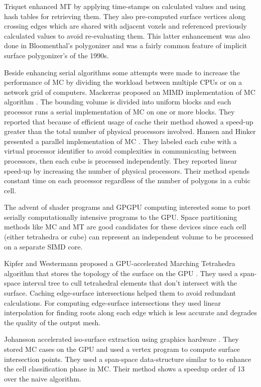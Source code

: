 Triquet \etal \cite{Triquet2003} enhanced MT by applying time-stamps on calculated values and using hash tables for retrieving them. They
also pre-computed surface vertices along crossing edges which are shared with adjacent voxels and referenced previously calculated
values to avoid re-evaluating them. This latter enhancement was also done in Bloomenthal's polygonizer \cite{Bloomenthal1994a}
and was a fairly common feature of implicit surface polygonizer's of the 1990s.

Beside enhancing serial algorithms some attempts were made to increase the performance of MC by dividing the workload between
multiple CPUs or on a network grid of computers. Mackerras proposed an MIMD implementation of MC algorithm \cite{mackerras1992fast}. 
The bounding volume is divided into uniform blocks and each processor runs a serial implementation of MC on one or more blocks. They 
reported that because of efficient usage of cache their method showed a speed-up greater than the total number of physical
processors involved. Hansen and Hinker presented a parallel implementation of MC \cite{hansen1992massively}. They labeled each cube
with a virtual processor identifier to avoid complexities in communicating between processors, then each cube is processed
independently. They reported linear speed-up by increasing the number of physical processors. Their method spends constant time on
each processor regardless of the number of polygons in a cubic cell.

The advent of shader programs and GPGPU computing interested some to port serially computationally intensive programs to the GPU. 
Space partitioning methods like MC and MT are good candidates for these devices since each cell (either tetrahedra or
cube) can represent an independent volume to be processed on a separate SIMD core. 

Kipfer and Westermann proposed a GPU-accelerated Marching Tetrahedra algorithm that stores the topology of the
surface on the GPU \cite{Kipfer2005}. They used a span-space interval tree to cull tetrahedral elements that don't intersect with the 
surface. Caching edge-surface intersections helped them to avoid redundant calculations. For computing edge-surface intersections they used
linear interpolation for finding roots along each edge which is less accurate and degrades the quality of the output mesh.  

Johansson \etal accelerated iso-surface extraction using graphics hardware \cite{Johansson2006}. They stored MC cases on the GPU 
and used a vertex program to compute surface intersection points. They used a span-space data-structure similar to \cite{Cignoni1997} to
enhance the cell classification phase in MC. Their method shows a speedup order of 13 over the naive algorithm.  


